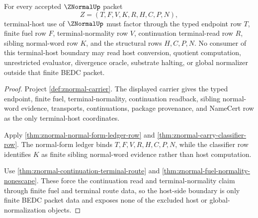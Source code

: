 \begin{theorem}
\label{thm:znormal-terminal-host-boundary}
For every accepted $\ZNormalUp$ packet
$$
Z=(T,F,V,K,R,H,C,P,N),
$$
terminal-host use of $\ZNormalUp$ must factor through the typed endpoint row $T$, finite fuel row $F$, terminal-normality row $V$, continuation terminal-read row $R$, sibling normal-word row $K$, and the structural rows $H,C,P,N$. No consumer of this terminal-host boundary may read host conversion, quotient computation, unrestricted evaluator, divergence oracle, substrate halting, or global normalizer outside that finite BEDC packet.
\end{theorem}
\begin{proof}
Project \autoref{def:znormal-carrier}. The displayed carrier gives the typed endpoint, finite fuel, terminal-normality, continuation readback, sibling normal-word evidence, transports, continuations, package provenance, and NameCert row as the only terminal-host coordinates.

Apply \autoref{thm:znormal-normal-form-ledger-row} and \autoref{thm:znormal-carry-classifier-row}. The normal-form ledger binds $T,F,V,R,H,C,P,N$, while the classifier row identifies $K$ as finite sibling normal-word evidence rather than host computation.

Use \autoref{thm:znormal-continuation-terminal-route} and \autoref{thm:znormal-fuel-normality-nonescape}. These force the continuation read and terminal-normality claim through finite fuel and terminal route data, so the host-side boundary is only finite BEDC packet data and exposes none of the excluded host or global-normalization objects.
\end{proof}

